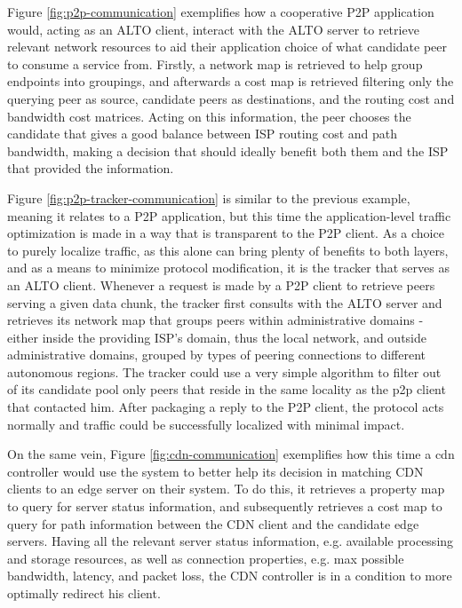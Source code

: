     Figure \ref{fig:p2p-communication} exemplifies how a cooperative P2P application would, acting as an ALTO client, interact with the ALTO server to retrieve relevant network resources to aid their application choice of what candidate peer to consume a service from.
    Firstly, a network map is retrieved to help group endpoints into groupings, and afterwards a cost map is retrieved filtering only the querying peer as source, candidate peers as destinations, and the routing cost and bandwidth cost matrices.
    Acting on this information, the peer chooses the candidate that gives a good balance between ISP routing cost and path bandwidth, making a decision that should ideally benefit both them and the ISP that provided the information.

    Figure \ref{fig:p2p-tracker-communication} is similar to the previous example, meaning it relates to a P2P application, but this time the application-level traffic optimization is made in a way that is transparent to the P2P client.
    As a choice to purely localize traffic, as this alone can bring plenty of benefits to both layers, and as a means to minimize protocol modification, it is the tracker that serves as an ALTO client.
    Whenever a request is made by a P2P client to retrieve peers serving a given data chunk, the tracker first consults with the ALTO server and retrieves its network map that groups peers within administrative domains - either inside the providing ISP's domain, thus the local network, and outside administrative domains, grouped by types of peering connections to different autonomous regions.
    The tracker could use a very simple algorithm to filter out of its candidate pool only peers that reside in the same locality as the p2p client that contacted him.
    After packaging a reply to the P2P client, the protocol acts normally and traffic could be successfully localized with minimal impact.


    On the same vein, Figure \ref{fig:cdn-communication} exemplifies how this time a cdn controller would use the system to better help its decision in matching CDN clients to an edge server on their system.
    To do this, it retrieves a property map to query for server status information, and subsequently retrieves a cost map to query for path information between the CDN client and the candidate edge servers.
    Having all the relevant server status information, e.g. available processing and storage resources, as well as connection properties, e.g. max possible bandwidth, latency, and packet loss, the CDN controller is in a condition to more optimally redirect his client.

